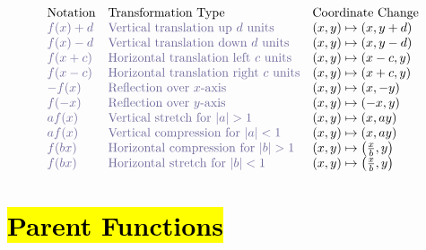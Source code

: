 \documentclass[12pt,a4paper]{article}
\begin{document}
\[
\begin{array}{lll}
\text{Notation} & \text{Transformation Type} & \text{Coordinate Change} \\
\textcolor{CadetBlue}{f(x)+d} & \textcolor{CadetBlue}{\text{Vertical translation up } d \text{ units}} & (x, y) \mapsto(x, y+d) \\
\textcolor{CadetBlue}{f(x)-d} & \textcolor{CadetBlue}{\text{Vertical translation down } d \text{ units}} & (x, y) \mapsto(x, y-d) \\
\textcolor{CadetBlue}{f(x+c)} & \textcolor{CadetBlue}{\text{Horizontal translation left } c \text{ units}} & (x, y) \mapsto(x-c, y) \\
\textcolor{CadetBlue}{f(x-c)} & \textcolor{CadetBlue}{\text{Horizontal translation right } c \text{ units}} & (x, y) \mapsto(x+c, y) \\
\textcolor{CadetBlue}{-f(x)} & \textcolor{CadetBlue}{\text{Reflection over } x \text{-axis}} & (x, y) \mapsto(x,-y) \\
\textcolor{CadetBlue}{f(-x)} & \textcolor{CadetBlue}{\text{Reflection over } y \text{-axis}} & (x, y) \mapsto(-x, y) \\
\textcolor{CadetBlue}{a f(x)} & \textcolor{CadetBlue}{\text{Vertical stretch for } |a|>1} & (x, y) \mapsto(x, a y) \\
\textcolor{CadetBlue}{a f(x)} & \textcolor{CadetBlue}{\text{Vertical compression for } |a|<1} & (x, y) \mapsto(x, a y) \\
\textcolor{CadetBlue}{f(b x)} & \textcolor{CadetBlue}{\text{Horizontal compression for } |b|>1} & (x, y) \mapsto\left(\frac{x}{b}, y\right) \\
\textcolor{CadetBlue}{f(b x)} & \textcolor{CadetBlue}{\text{Horizontal stretch for } |b|<1} & (x, y) \mapsto\left(\frac{x}{b}, y\right)
\end{array}
\]


\newpage
\section*{\hl{Parent Functions}}
\end{document}
